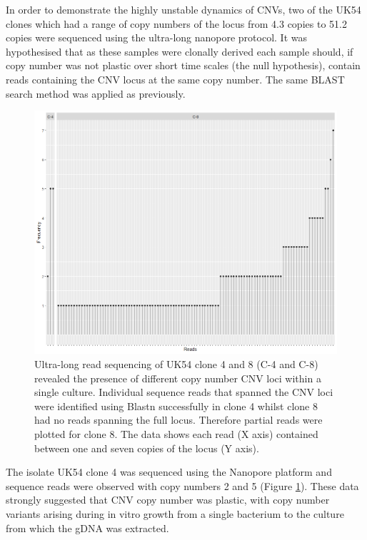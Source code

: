 \documentclass{article}
\begin{document}
In order to demonstrate the highly unstable dynamics of CNVs, two of the UK54 clones which had a range of copy numbers of the locus from 4.3 copies to 51.2 copies were sequenced using the ultra-long nanopore protocol. It was hypothesised that as these samples were clonally derived each sample should, if copy number was not plastic over short time scales (the null hypothesis), contain reads containing the CNV locus at the same copy number. The same BLAST search method was applied as previously.

\begin{figure}[h!]
\centering
\includegraphics[width=\textwidth{}]{Chapter_2/clone 4 and 8.png}
\caption{ Ultra-long read sequencing of UK54 clone 4 and 8 (C-4 and C-8) revealed the presence of different copy number CNV loci within a single culture. Individual sequence reads that spanned the CNV loci were identified using Blastn successfully in clone 4 whilst clone 8 had no reads spanning the full locus. Therefore partial reads were plotted for clone 8. The data shows each read (X axis) contained between one and seven copies of the locus (Y axis).}
\label{fig:Clone_4_8_reads}
\end{figure}

The isolate UK54 clone 4 was sequenced using the Nanopore platform and sequence reads were observed with copy numbers  2 and 5 (Figure \ref{fig:Clone_4_8_reads}). These data strongly suggested that CNV copy number was plastic, with copy number variants arising during in vitro growth from a single bacterium to the culture from which the gDNA was extracted. 
\end{document}
